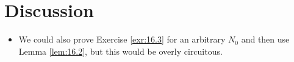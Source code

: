 \documentclass{report}
\begin{document}



\section{Discussion}
\begin{itemize}
    \item We could also prove Exercise \ref{exr:16.3} for an arbitrary $N_0$ and then use Lemma \ref{lem:16.2}, but this would be overly circuitous.
\end{itemize}
\end{document}
